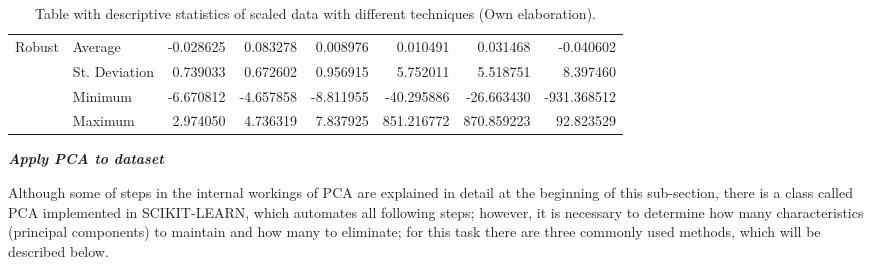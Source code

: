 \begin{landscape}
\begin{table}[p!]
\begin{tabular}{ll|r|r|r|r|r|r|}
\multicolumn{1}{|l|}{\multirow{4}{*}{Robust}} & Average & -0.028625 & 0.083278 & 0.008976 & 0.010491 & 0.031468 & -0.040602 \\ \cline{2-8} 
\multicolumn{1}{|l|}{}                  & St. Deviation & 0.739033 & 0.672602 & 0.956915 & 5.752011 & 5.518751 & 8.397460 \\\cline{2-8} 
\multicolumn{1}{|l|}{}                  & Minimum & -6.670812 & -4.657858	& -8.811955 & -40.295886 & -26.663430 & -931.368512 \\ \cline{2-8} 
\multicolumn{1}{|l|}{}                  & Maximum & 2.974050 & 4.736319 & 7.837925 & 851.216772 & 870.859223 & 92.823529 \\ \hline
\end{tabular}
\caption{Table with descriptive statistics of scaled data with different techniques (Own elaboration).}
\label{table:scalers}
\end{table}
\end{landscape}


\pagestyle{thesis}

\vspace{5mm} %

\textbf{\textit{Apply PCA to dataset}}

\vspace{5mm} %

Although some of steps in the internal workings of PCA are explained in detail at the beginning of this sub-section, there is a class called PCA implemented in \textsc{SCIKIT-LEARN}, which automates all following steps; however, it is necessary to determine how many characteristics (principal components) to maintain and how many to eliminate; for this task there are three commonly used methods, which will be described below.

